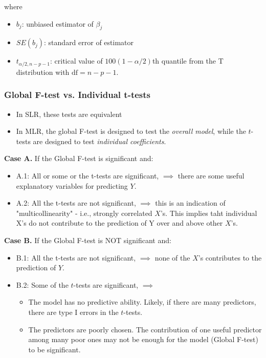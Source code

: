 \documentclass[11pt]{article}
\theoremstyle{definition}
\numberwithin{equation}{section}
\begin{document}
where
\begin{itemize}
  \item $b_j$: unbiased estimator of $\beta_j$
  \item $SE(b_j)$: standard error of estimator
  \item $t_{\alpha/2, n-p-1}$: critical value of $100(1-\alpha/2)$th quantile from the T distribution with $\text{df}=n-p-1$.
\end{itemize}

\subsubsection{Global F-test vs. Individual t-tests}
\begin{itemize}
\item In SLR, these tests are equivalent
\item In MLR, the global F-test is designed to test the \textit{overall model}, while the $t$-tests are designed to test \textit{individual coefficients}.
\end{itemize}

\textbf{Case A.} If the Global F-test is significant and:
\begin{itemize}
\item A.1: All or some or the t-tests are significant, $\implies$ there are some useful explanatory variables for predicting $Y$.
\item A.2: All the t-tests are not significant, $\implies$ this is an indication of "multicollinearity" - i.e., strongly correlated $X$'s. This implies taht individual X's do not contribute to the prediction of Y over and above other $X$'s.
\end{itemize}

\textbf{Case B.} If the Global F-test is NOT significant and:
\begin{itemize}
\item B.1: All the t-tests are not significant, $\implies$ none of the $X$'s contributes to the prediction of $Y$.
\item B.2: Some of the $t$-tests are significant, $\implies$
\begin{itemize}
\item The model has no predictive ability. Likely, if there are many predictors, there are type I errors in the $t$-tests.
\item The predictors are poorly chosen. The contribution of one useful predictor among many poor ones may not be enough for the model (Global F-test) to be significant.
\end{itemize}
\end{itemize}
\end{document}
